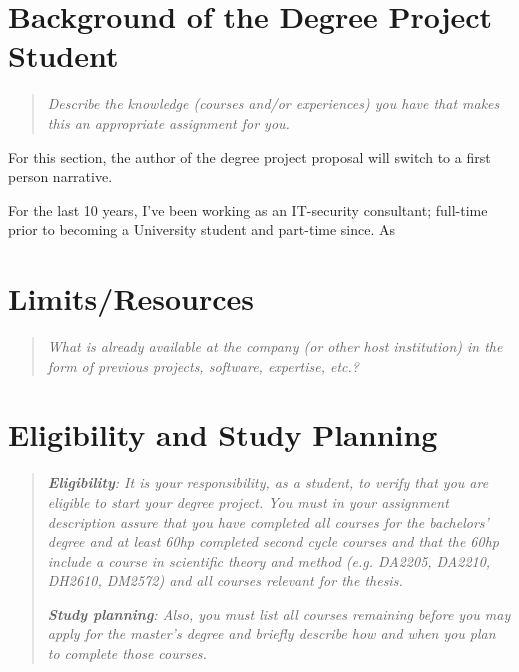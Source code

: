 \documentclass[12pt, a4paper]{article}
\begin{document}

\section{Background of the Degree Project Student}

\begin{quote}
	\textit{Describe the knowledge (courses and/or experiences) you have that makes this an appropriate assignment for you.}
\end{quote}

For this section, the author of the degree project proposal will switch to a first person narrative.

For the last 10 years, I've been working as an IT-security consultant; full-time prior to becoming a University student and part-time since. As 

\section{Limits/Resources}

\begin{quote}
	\textit{What is already available at the company (or other host institution) in the form of previous projects, software, expertise, etc.?}
\end{quote}



\section{Eligibility and Study Planning}

\begin{quote}
	\textit{\textbf{Eligibility}: It is your responsibility, as a student, to verify that you are eligible to start your degree project. You must in your assignment description assure that you have completed all courses for the bachelors' degree and at least 60hp completed second cycle courses and that the 60hp include a course in scientific theory and method (e.g. DA2205, DA2210, DH2610, DM2572) and all courses relevant for the thesis.}

	\textit{\textbf{Study planning}: Also, you must list all courses remaining before you may apply for the master's degree and briefly describe how and when you plan to complete those courses.}
\end{quote}
\end{document}
